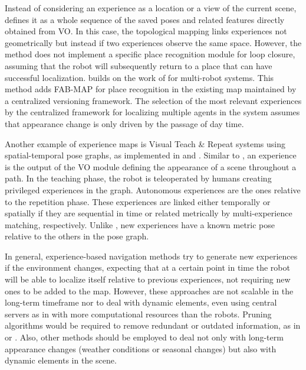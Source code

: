 Instead of considering an experience as a location or a view of the current scene, \cite{churchill-newman:2013:0278364913499193} defines it as a whole sequence of the saved poses and related features directly obtained from VO. In this case, the topological mapping links experiences not geometrically but instead if two experiences observe the same space. However, the method does not implement a specific place recognition module for loop closure, assuming that the robot will subsequently return to a place that can have successful localization.
\cite{gadd-newman:2016:7759843} builds on the work of \cite{churchill-newman:2013:0278364913499193} for multi-robot systems. This method adds FAB-MAP for place recognition in the existing map maintained by a centralized versioning framework. The selection of the most relevant experiences by the centralized framework for localizing multiple agents in the system assumes that appearance change is only driven by the passage of day time.

Another example of experience maps is Visual Teach \& Repeat systems using spatial-temporal pose graphs, as implemented in \cite{mactavish-et-al:2018:21838} and \cite{zhang-et-al:2018:8460674}.
Similar to \cite{churchill-newman:2013:0278364913499193}, an experience is the output of the VO module defining the appearance of a scene throughout a path. In the teaching phase, the robot is teleoperated by humans creating privileged experiences in the graph.
Autonomous experiences are the ones relative to the repetition phase. These experiences are linked either temporally or spatially if they are sequential in time or related metrically by multi-experience matching, respectively.
Unlike \cite{churchill-newman:2013:0278364913499193}, new experiences have a known metric pose relative to the others in the pose graph.

In general, experience-based navigation methods try to generate new experiences if the environment changes, expecting that at a certain point in time the robot will be able to localize itself relative to previous experiences, not requiring new ones to be added to the map.
However, these approaches are not scalable in the long-term timeframe nor to deal with dynamic elements, even using central servers as in \cite{gadd-newman:2016:7759843} with more computational resources than the robots.
Pruning algorithms would be required to remove redundant or outdated information, as in \cite{konolige-bowman:2009:5354121} or \cite{tang-et-al:2019:7}.
Also, other methods should be employed to deal not only with long-term appearance changes (weather conditions or seasonal changes) but also with dynamic elements in the scene.



